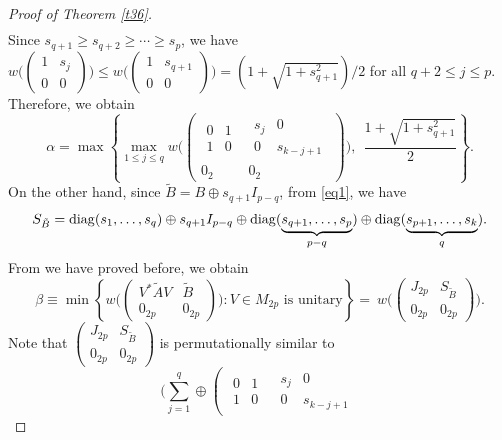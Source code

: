 \documentclass[11pt]{article}
\numberwithin{equation}{section}
\def\diag{{\rm diag}}
\begin{document}
\begin{proof}[Proof of Theorem \ref{t36}]
\begin{eqnarray*}
\end{eqnarray*}
Since $s_{q+1}\ge s_{q+2}\ge \cdots\ge s_p$, we have
$w\Big(\begin{pmatrix} 1 & s_{j}\\ 0 & 0\end{pmatrix}\Big) \le w\Big(\begin{pmatrix} 1 & s_{q+1}\\ 0 & 0\end{pmatrix}\Big)=(1+\sqrt{1+s_{q+1}^2})/2$ for all $q+2\le j\le p$. Therefore, we obtain
\begin{equation}\label{ee1}
\alpha=\max\left\{\max_{1\le j\le q}w\Big(\left(\begin{array}{c|c}\begin{array}{cc} 0 & 1\\ 1 & 0\end{array} & \begin{array}{cc} s_j & 0\\ 0 & s_{k-j+1}\end{array}
\\ \hline 0_2 & 0_2\end{array}\right)\Big), \ \ \frac{1+\sqrt{1+s_{q+1}^2}}{2}\right\}.
\end{equation}
On the other hand, since $\tilde{B} = B \oplus s_{q+1}I_{p-q}$, from \eqref{eq1}, we have
$$S_{\tilde{B}}=\diag(s_1, \dots, s_q)\oplus s_{q+1}I_{p-q}\oplus \diag(\underbrace{s_{q+1}, \dots, s_p}_{p-q})\oplus \diag(\underbrace{s_{p+1}, \dots, s_k}_q).$$
From we have proved before, we obtain
$$
\beta  \equiv  \min\left\{w\Big(\begin{pmatrix} V^* \tilde{A}V & \tilde{B}\\ 0_{2p} & 0_{2p}\end{pmatrix}\Big) : V\in M_{2p} \mbox{ is unitary}\right\}
=  \ w\Big(\left(\begin{array}{cc} J_{2p} & S_{\tilde{B}}
\\ 0_{2p} & 0_{2p}\end{array}\right)\Big). $$
Note that $\left(\begin{array}{cc} J_{2p} & S_{\tilde{B}}
\\ 0_{2p} & 0_{2p}\end{array}\right)$ is permutationally similar to
$$\Bigg(\sum_{j=1}^q\oplus\left(\begin{array}{c|c}\begin{array}{cc} 0 & 1\\ 1 & 0\end{array} & \begin{array}{cc} s_j & 0\\ 0 & s_{k-j+1}\end{array}

\end{array}$$
\end{proof}
\end{document}
